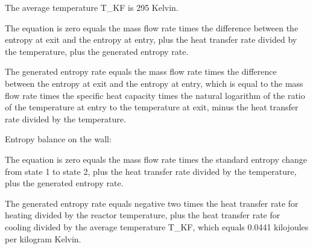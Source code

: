 The average temperature T_KF is 295 Kelvin.

The equation is zero equals the mass flow rate times the difference between the entropy at exit and the entropy at entry, plus the heat transfer rate divided by the temperature, plus the generated entropy rate.

The generated entropy rate equals the mass flow rate times the difference between the entropy at exit and the entropy at entry, which is equal to the mass flow rate times the specific heat capacity times the natural logarithm of the ratio of the temperature at entry to the temperature at exit, minus the heat transfer rate divided by the temperature.

Entropy balance on the wall:

The equation is zero equals the mass flow rate times the standard entropy change from state 1 to state 2, plus the heat transfer rate divided by the temperature, plus the generated entropy rate.

The generated entropy rate equals negative two times the heat transfer rate for heating divided by the reactor temperature, plus the heat transfer rate for cooling divided by the average temperature T_KF, which equals 0.0441 kilojoules per kilogram Kelvin.